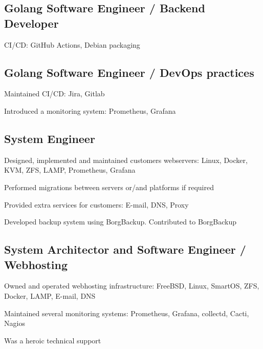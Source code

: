 \documentclass[letter,10pt]{article}
\begin{document}
\subsection{Golang Software Engineer / Backend Developer}
\begin{zitemize}
\item CI/CD: GitHub Actions, Debian packaging
\end{zitemize}

\subsection{{Golang Software Engineer / DevOps practices}}
\begin{zitemize}
\item Maintained CI/CD: Jira, Gitlab
\item Introduced a monitoring system: Prometheus, Grafana
\end{zitemize}

\subsection{{System Engineer}}
\begin{zitemize}
\item Designed, implemented and maintained customers webservers: Linux, Docker, KVM, ZFS, LAMP, Prometheus, Grafana
\item Performed migrations between servers or/and platforms if required
\item Provided extra services for customers: E-mail, DNS, Proxy
\item Developed backup system using BorgBackup. Contributed to BorgBackup
\end{zitemize}


\subsection{{System Architector and Software Engineer / Webhosting}}
\begin{zitemize}
\item Owned and operated webhosting infrastructure: FreeBSD, Linux, SmartOS, ZFS, Docker, LAMP, E-mail, DNS
\item Maintained several monitoring systems: Prometheus, Grafana, collectd, Cacti, Nagios
\item Was a heroic technical support
\end{zitemize}
\end{document}
